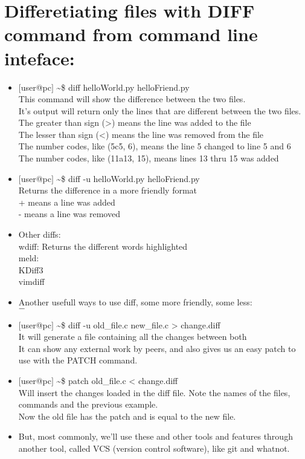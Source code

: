 \documentclass[12pt,a4paper]{article} %
\begin{document}
\section{Differetiating files with DIFF command from command line inteface:}
\begin{itemize}
\item $[$user@pc$]$ \textasciitilde\$ diff helloWorld.py helloFriend.py\\
\tabto{1.1cm} This command will show the difference between the two files.\\
\tabto{1.1cm}It's output will return only the lines that are different between the two files.\\
\tabto{2.2cm}The greater than sign (>) means the line was added to the file\\
\tabto{2.2cm}The lesser than sign (<) means the line was removed from the file\\
\tabto{2.2cm}The number codes, like (5c5, 6), means the line 5 changed to line 5 and 6\\
\tabto{2.2cm}The number codes, like (11a13, 15), means lines 13 thru 15 was added\\
\item $[$user@pc$]$ \textasciitilde\$ diff -u helloWorld.py helloFriend.py\\
\tabto{1.1cm}Returns the difference in a more friendly format\\
\tabto{2.2cm}+ means a line was added\\
\tabto{2.2cm}- means a line was removed\\
\item Other diffs:\\
\tabto{1.1cm}wdiff: Returns the different words highlighted\\
\tabto{1.1cm}meld:\\
\tabto{1.1cm}KDiff3\\
\tabto{1.1cm}vimdiff\\
\item Another usefull ways to use diff, some more friendly, some less:\\
\tabto{1.1cm}$-$
\item $[$user@pc$]$ \textasciitilde\$ diff -u old\_file.c new\_file.c > change.diff\\
\tabto{1.1cm}It will generate a file containing all the changes between both\\
\tabto{1.1cm}It can show any external work by peers, and also gives us an easy patch to use with the PATCH command.\\
\item $[$user@pc$]$ \textasciitilde\$ patch old\_file.c < change.diff\\
\tabto{1.1cm}Will insert the changes loaded in the diff file. Note the names of the files, commands and the previous example.\\
Now the old file has the patch and is equal to the new file.\\
\item But, most commonly, we'll use these and other tools and features through another tool, called VCS (version control software), like git and whatnot.
\end{itemize}
\end{document}
